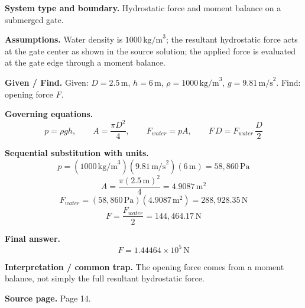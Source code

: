\textbf{System type and boundary.} Hydrostatic force and moment balance on a submerged gate.

\textbf{Assumptions.} Water density is $1000\,\text{kg/m}^3$; the resultant hydrostatic force acts at the gate center as shown in the source solution; the applied force is evaluated at the gate edge through a moment balance.

\textbf{Given / Find.}
Given: $D=2.5\,\text{m}$, $h=6\,\text{m}$, $\rho=1000\,\text{kg/m}^3$, $g=9.81\,\text{m/s}^2$.
Find: opening force $F$.

\textbf{Governing equations.}
\[
p=\rho gh,\qquad A=\frac{\pi D^2}{4},\qquad F_{water}=pA,
\qquad F\,D=F_{water}\,\frac{D}{2}
\]

\textbf{Sequential substitution with units.}
\[
p=(1000\,\text{kg/m}^3)(9.81\,\text{m/s}^2)(6\,\text{m})=58{,}860\,\text{Pa}
\]
\[
A=\frac{\pi(2.5\,\text{m})^2}{4}=4.9087\,\text{m}^2
\]
\[
F_{water}=(58{,}860\,\text{Pa})(4.9087\,\text{m}^2)=288{,}928.35\,\text{N}
\]
\[
F=\frac{F_{water}}{2}=144{,}464.17\,\text{N}
\]

\textbf{Final answer.}
\[
\boxed{F=1.44464\times10^5\,\text{N}}
\]

\textbf{Interpretation / common trap.} The opening force comes from a moment balance, not simply the full resultant hydrostatic force.

\textbf{Source page.} Page 14.
